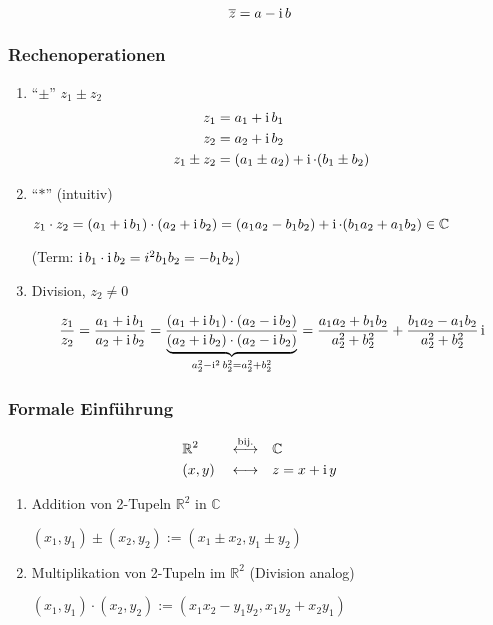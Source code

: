 \begin{definition}
 \[ \overline{z} = a - \operatorname{i} b \]
\end{definition}

\subsubsection*{Rechenoperationen}

\begin{enumerate}

\item "`$\pm$"' $z_1 \pm z_2$
\begin{align*}
z_1 & = a_1 + \operatorname{i} b_1 \\ 
z_2 & = a_2 + \operatorname{i} b_2 \\
z_1 \pm z_2 & = (a_1 \pm a_2) + \operatorname{i} \cdot (b_1 \pm b_2)
\end{align*}

\item "`$\ast$"' (intuitiv)

$z_1 \cdot z_2 = (a_1 + \operatorname{i} b_1) \cdot (a_2 + \operatorname{i} b_2) = (a_1 a_2 - b_1 b_2) + \operatorname{i} \cdot (b_1 a_2 + a_1 b_2) \in \mathbb{C}$

(Term: $\operatorname{i} b_1 \cdot \operatorname{i} b_2 = i^2 b_1 b_2 = - b_1 b_2$)

\item Division, $z_2 \neq 0$

$$ \frac{z_1}{z_2} = \frac{a_1 + \operatorname{i} b_1}{a_2 + \operatorname{i} b_2} = \frac{(a_1 + \operatorname{i} b_1) \cdot (a_2 - \operatorname{i} b_2)}{\underbrace{(a_2 + \operatorname{i} b_2) \cdot (a_2 - \operatorname{i} b_2)}_{a_2^2 - \operatorname{i}^2 b_2^2 = a_2^2 + b_2^2}} = \frac{a_1 a_2 + b_1 b_2}{a_2^2 + b_2^2} + \frac{b_1 a_2 - a_1 b_2}{a_2^2 + b_2^2} \operatorname{i} $$

\end{enumerate}

\subsubsection*{Formale Einführung}
\begin{alignat*}{3}
& \mathbb{R}^2 && \overset{\text{bij.}}{\longleftrightarrow} && \mathbb{C} \\
& (x, y) && \longleftrightarrow && z = x + \operatorname{i} y
\end{alignat*}
\begin{enumerate}
\item Addition von 2-Tupeln $\mathbb{R}^2$ in $\mathbb{C}$

$(x_1, y_1) \pm (x_2, y_2) := (x_1 \pm x_2, y_1 \pm y_2)$

\item Multiplikation von 2-Tupeln im $\mathbb{R}^2$ (Division analog)

$ (x_1, y_1) \cdot (x_2, y_2) := (x_1 x_2 - y_1 y_2, x_1 y_2 + x_2 y_1)$
\end{enumerate}

